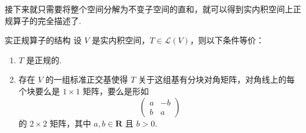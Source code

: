 接下来就只需要将整个空间分解为不变子空间的直和，就可以得到实内积空间上正规算子的完全描述了.

\begin{theorem}{}{实正规算子的结构}
    设 $ V $ 是实内积空间，$ T \in \mathcal{L}(V) $，则以下条件等价：
    \begin{enumerate}
        \item $ T $ 是正规的.

        \item 存在 $ V $ 的一组标准正交基使得 $ T $ 关于这组基有分块对角矩阵，对角线上的每个块要么是 $ 1 \times 1 $ 矩阵，要么是形如
              \[
                  \begin{pmatrix}
                      a & -b \\
                      b & a
                  \end{pmatrix}
              \]
              的 $ 2 \times 2 $ 矩阵，其中 $ a, b \in \mathbf{R} $ 且 $ b > 0 $.
    \end{enumerate}
\end{theorem}

